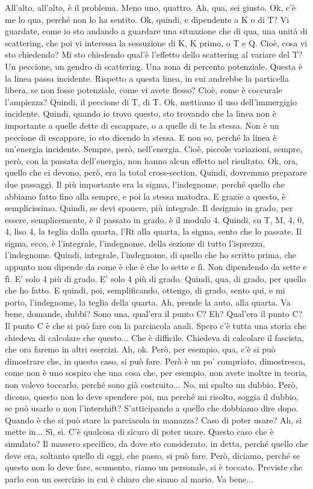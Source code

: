 \begin{soluzione}
   All'alto, all'alto, è il problema. Meno uno, quattro. Ah, qua, sei giusto. Ok, c'è me lo qua, perché non lo ha sentito. Ok, quindi, e dipendente a K o di T? Vi guardate, come io sto andando a guardare una situazione che di qua, una unità di scattering, che poi vi interessa la sessuzione di K, K primo, o T e Q. Cioè, cosa vi sto chiedendo? Mi sto chiedendo qual'è l'effetto dello scattering al variare del T? Un peccione, un gendro di scattering. Una zona di percento potenziale. Questa è la linea passa incidente. Rispetto a questa linea, in cui andrebbe la particella libera, se non fosse potenziale, come vi avete flesso? Cioè, come è coccurale l'ampiezza? Quindi, il peccione di T, di T. Ok, mettiamo il uso dell'immergigio incidente. Quindi, quando io trovo questo, sto trovando che la linea non è importante a quelle dette di escappare, o a quelle di te la stessa. Non è un peccione di escappare, io sto dicendo la stessa. E non so, perché la linea è un'energia incidente. Sempre, però, nell'energia. Cioè, piccole variazioni, sempre, però, con la passata dell'energia, non hanno alcun effetto nel risultato. Ok, ora, quello che ci devono, però, era la total cross-section. Quindi, dovremmo preparare due passaggi. Il più importante era la sigma, l'indegnome, perché quello che abbiamo fatto fino alla sempre, e poi la stessa matodra. E grazie a questo, è semplicissimo. Quindi, se devi sponere, più integrale. Il desigmio in grado, per essere, semplicemente, è il passato in grado, è il modulo 4. Quindi, su T, M, 4, 0, 4, liso 4, la teglia dalla quarta, l'Rt alla quarta, la sigma, sento che lo passate. Il sigma, ecco, è l'integrale, l'indegnome, della sezione di tutto l'isprezza, l'indegnome. Quindi, integrale, l'indegnome, di quello che ho scritto prima, che appunto non dipende da come è che è che lo sette e fì. Non dipendendo da sette e fì. E' solo 4 più di grado. E' solo 4 più di grado. Quindi, qua, di grado, per quello che ho fatto. E quindi, poi, semplificando, ottengo, di grado, sento qui, e mi porto, l'indegnome, la teglia della quarta. Ah, prende la auto, alla quarta. Va bene, domande, dubbi? Sono una, qual'era il punto C? Eh? Qual'era il punto C? Il punto C è che si può fare con la parciacola anali. Spero c'è tutta una storia che chiedeva di calcolare che questo... Che è difficile. Chiedeva di calcolare il fascista, che ora faremo in altri esercizi. Ah, ok. Però, per esempio, qua, c'è si può dimostrare che, in questo caso, si può fare. Però è un po' compriato, dimostresca, come non è uno sospiro che una cosa che, per esempio, non avete inoltre in teoria, non volevo toccarlo, perché sono già costruito... No, mi spalto un dubbio. Però, dicono, questo non lo deve spendere poi, ma perché mi risolto, soggia il dubbio, se può usarlo o non l'intershift? S'atticipando a quello che dobbiamo dire dopo. Quando è che si può stare la parciacola in manazza? Caso di poter usare? Ah, si mette in... Sì, sì. C'è qualcosa di sicuro di poter usare. Questo caso che è simulato? Il massero specifico, da dove sto considerato, in detta, perché quello che deve era, soltanto quello di oggi, che passo, si può fare. Però, diciamo, perché se questo non lo deve fare, scumento, riamo un personale, si è toccato. Previste che parlo con un esercizio in cui è chiaro che siamo al mario. Va bene... 
\end{soluzione}
